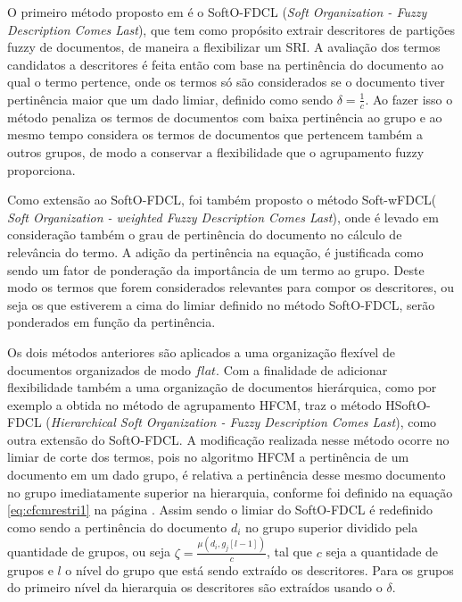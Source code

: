 O primeiro método proposto em  é o SoftO-FDCL (\textit{Soft Organization - Fuzzy Description Comes
Last\/}), que tem como propósito extrair descritores de partições fuzzy de documentos, de maneira a
flexibilizar um SRI. A avaliação dos termos candidatos a descritores é feita então com base na
pertinência do documento ao qual o termo pertence, onde os termos só são considerados se o documento
tiver pertinência maior que um dado limiar, definido como sendo 
$\delta = \frac{1}{c}$. Ao fazer isso o método penaliza os termos de
documentos com baixa pertinência ao grupo e ao mesmo tempo considera os termos de documentos que
pertencem também a outros grupos, de modo a conservar a flexibilidade que o agrupamento fuzzy
proporciona. 

Como extensão ao SoftO-FDCL, foi também proposto o método Soft-wFDCL(\textit{ Soft
Organization - weighted Fuzzy Description Comes Last\/}), onde é levado em consideração também o
grau de pertinência do documento no cálculo de relevância do termo. A adição da pertinência na
equação, é justificada como sendo um fator de ponderação da importância de um termo ao grupo. Deste
modo os termos que forem considerados relevantes para compor os descritores, ou seja os que
estiverem a cima do limiar definido no método SoftO-FDCL, serão ponderados em função da pertinência.

Os dois métodos anteriores são aplicados a uma organização flexível de documentos organizados de
modo $flat$. Com a finalidade de adicionar flexibilidade também a uma organização de
documentos hierárquica, como por exemplo a obtida no método de
agrupamento HFCM,  traz o método HSoftO-FDCL (\textit{Hierarchical Soft
Organization - Fuzzy Description Comes Last\/}), como outra extensão do SoftO-FDCL. 
A modificação realizada nesse método ocorre no limiar de corte dos termos, pois no algoritmo HFCM a
pertinência de um documento em um dado grupo, é relativa a pertinência desse mesmo documento no
grupo imediatamente superior na hierarquia, conforme foi definido na equação \ref{eq:cfcmrestri1} na
página \pageref{eq:cfcmrestri1}. Assim sendo o limiar do SoftO-FDCL é redefinido como
sendo a pertinência do documento $d_i$ no grupo superior dividido pela quantidade de grupos, ou seja
$\zeta = \frac{\mu(d_i,g_j[l-1])}{c}$, tal que $c$ seja a quantidade de grupos e $l$ o nível do
grupo que está sendo extraído os descritores. Para os grupos do primeiro nível da hierarquia os
descritores são extraídos usando o $\delta$. 


